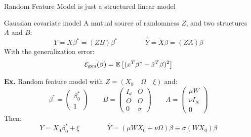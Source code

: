 \documentclass[10pt]{beamer}
\begin{document}
\begin{frame}{Random Feature Model is just a structured linear model}
  \begin{block}{Gaussian covariate model \cite{loureiro2021capturing}}
    A mutual source of randomness $Z$, and two structures $A$ and $B$:
    \begin{equation*}
      Y = X \beta^* = (ZB) \beta^* \qquad \qquad \hat Y = \tilde X \beta = (Z A) \beta
    \end{equation*}
    With the generalization error:
    \begin{equation*}
      \mathcal E_{\text{gen}}(\beta) = \mathbb E\left[ ( x^T \beta^* - \tilde x^T \beta)^2 \right]
    \end{equation*}
  \end{block}

  \textbf{Ex.} Random feature model with $Z= (X_0 \quad \Omega \quad \xi)$ and:
  \begin{equation*}
    \beta^* = \begin{pmatrix}
      \beta_0^*\\
      1
    \end{pmatrix}
    \qquad
    B = \begin{pmatrix}
      I_d & O\\
      O & O\\
      0 & \sigma
    \end{pmatrix}
    \qquad
    A=\begin{pmatrix}
      \mu W \\
      \nu I_{N}\\
      0
    \end{pmatrix}
  \end{equation*}
  Then:
  \begin{equation*}
    Y = X_0 \beta_0^* + \xi \qquad \qquad \hat Y = \left( \mu W X_0 + \nu \Omega \right) \beta
    \equiv \sigma(WX_0) \beta
  \end{equation*}
\end{frame}
\end{document}
